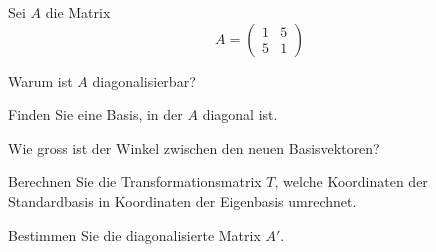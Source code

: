 Sei $A$ die Matrix
\[
A=\begin{pmatrix}
1&5\\
5&1
\end{pmatrix}
\]
\begin{teilaufgaben}
\item Warum ist $A$ diagonalisierbar?
\item Finden Sie eine Basis, in der $A$ diagonal ist.
\item Wie gross ist der Winkel zwischen den neuen Basisvektoren?
\item Berechnen Sie die Transformationsmatrix $T$, welche Koordinaten der Standardbasis in Koordinaten der Eigenbasis umrechnet.
\item Bestimmen Sie die diagonalisierte Matrix $A'$.
\end{teilaufgaben}


